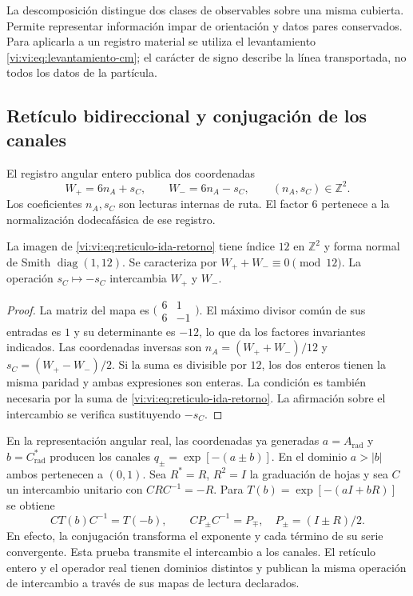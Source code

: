 La descomposición distingue dos clases de observables sobre una
misma cubierta. Permite representar información impar de orientación
y datos pares conservados. Para aplicarla a un registro material se
utiliza el levantamiento \eqref{vi:vi:eq:levantamiento-cm}; el carácter
de signo describe la línea transportada, no todos los datos de la
partícula.

\subsection{Retículo bidireccional y conjugación de los canales}
\label{vi:vi:subsec:reticulo-bidireccional}

El registro angular entero publica dos coordenadas
\begin{equation}
 W_+=6n_A+s_C,\qquad W_-=6n_A-s_C,
 \qquad (n_A,s_C)\in\mathbb Z^2.
 \label{vi:vi:eq:reticulo-ida-retorno}
\end{equation}
Los coeficientes $n_A,s_C$ son lecturas internas de ruta. El factor
$6$ pertenece a la normalización dodecafásica de ese registro.

\begin{proposition}
\label{vi:vi:prop:indice-bidireccional}
La imagen de \eqref{vi:vi:eq:reticulo-ida-retorno} tiene índice $12$
en $\mathbb Z^2$ y forma normal de Smith $\operatorname{diag}(1,12)$.
Se caracteriza por $W_++W_-\equiv0\pmod{12}$. La operación
$s_C\mapsto-s_C$ intercambia $W_+$ y $W_-$.
\end{proposition}
\begin{proof}
La matriz del mapa es
$\bigl(\begin{smallmatrix}6&1\\6&-1\end{smallmatrix}\bigr)$.
El máximo divisor común de sus entradas es $1$ y su determinante
es $-12$, lo que da los factores invariantes indicados. Las
coordenadas inversas son
$n_A=(W_++W_-)/12$ y $s_C=(W_+-W_-)/2$.
Si la suma es divisible por $12$, los dos enteros tienen la misma
paridad y ambas expresiones son enteras. La condición es también
necesaria por la suma de \eqref{vi:vi:eq:reticulo-ida-retorno}.
La afirmación sobre el intercambio se verifica sustituyendo $-s_C$.
\end{proof}

En la representación angular real, las coordenadas ya generadas
$a=A_{\mathrm{rad}}$ y $b=C^*_{\mathrm{rad}}$ producen los
canales $q_\pm=\exp[-(a\pm b)]$. En el dominio $a>|b|$ ambos
pertenecen a $(0,1)$. Sea $R^*=R$, $R^2=I$ la graduación de
hojas y sea $C$ un intercambio unitario con $CRC^{-1}=-R$.
Para $T(b)=\exp[-(aI+bR)]$ se obtiene
\begin{equation}
 CT(b)C^{-1}=T(-b),\qquad
 CP_\pm C^{-1}=P_\mp,\quad P_\pm=(I\pm R)/2.
 \label{vi:vi:eq:conjugacion-canales}
\end{equation}
En efecto, la conjugación transforma el exponente y cada término
de su serie convergente. Esta prueba transmite el intercambio a
los canales. El retículo entero y el operador real tienen dominios
distintos y publican la misma operación de intercambio a través de
sus mapas de lectura declarados.

